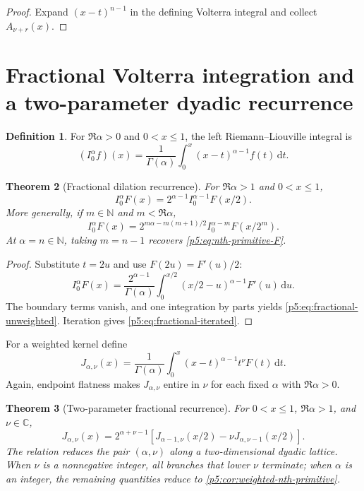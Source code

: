 \documentclass[11pt,oneside]{article}
\newtheorem{theorem}{Theorem}[section]
\theoremstyle{definition}
\newtheorem{definition}[theorem]{Definition}
\theoremstyle{remark}
\newcommand{\C}{\mathbb C}
\newcommand{\N}{\mathbb N}
\newcommand{\dd}{\,\mathrm d}
\newcommand{\1}{\mathbf 1}
\begin{document}
\begin{proof}
Expand $(x-t)^{n-1}$ in the defining Volterra integral and collect $A_{\nu+r}(x)$.
\end{proof}

\section{Fractional Volterra integration and a two-parameter dyadic recurrence}

\begin{definition}
For $\Re\alpha>0$ and $0<x\le1$, the left Riemann--Liouville integral is
\begin{equation}
 (I_0^\alpha f)(x)=\frac1{\Gamma(\alpha)}
 \int_0^x(x-t)^{\alpha-1}f(t)\dd t.
\end{equation}
\end{definition}

\begin{theorem}[Fractional dilation recurrence]\label{p5:thm:fractional-unweighted}
For $\Re\alpha>1$ and $0<x\le1$,
\begin{equation}\label{p5:eq:fractional-unweighted}
 I_0^\alpha F(x)=2^{\alpha-1}I_0^{\alpha-1}F(x/2).
\end{equation}
More generally, if $m\in\N$ and $m<\Re\alpha$,
\begin{equation}\label{p5:eq:fractional-iterated}
 I_0^\alpha F(x)=
 2^{m\alpha-m(m+1)/2}I_0^{\alpha-m}F(x/2^m).
\end{equation}
At $\alpha=n\in\N$, taking $m=n-1$ recovers \eqref{p5:eq:nth-primitive-F}.
\end{theorem}

\begin{proof}
Substitute $t=2u$ and use $F(2u)=F'(u)/2$:
\[
 I_0^\alpha F(x)=\frac{2^{\alpha-1}}{\Gamma(\alpha)}
 \int_0^{x/2}(x/2-u)^{\alpha-1}F'(u)\dd u.
\]
The boundary terms vanish, and one integration by parts yields \eqref{p5:eq:fractional-unweighted}.  Iteration gives \eqref{p5:eq:fractional-iterated}.
\end{proof}

For a weighted kernel define
\begin{equation}\label{p5:eq:J-alpha-nu}
 J_{\alpha,\nu}(x)=
 \frac1{\Gamma(\alpha)}\int_0^x
 (x-t)^{\alpha-1}t^\nu F(t)\dd t.
\end{equation}
Again, endpoint flatness makes $J_{\alpha,\nu}$ entire in $\nu$ for each fixed $\alpha$ with $\Re\alpha>0$.

\begin{theorem}[Two-parameter fractional recurrence]\label{p5:thm:fractional-weighted}
For $0<x\le1$, $\Re\alpha>1$, and $\nu\in\C$,
\begin{equation}\label{p5:eq:fractional-weighted}
\boxed{
 J_{\alpha,\nu}(x)=2^{\alpha+\nu-1}
 \left[J_{\alpha-1,\nu}(x/2)
       -\nu J_{\alpha,\nu-1}(x/2)\right].}
\end{equation}
The relation reduces the pair $(\alpha,\nu)$ along a two-dimensional dyadic lattice.  When $\nu$ is a nonnegative integer, all branches that lower $\nu$ terminate; when $\alpha$ is an integer, the remaining quantities reduce to \cref{p5:cor:weighted-nth-primitive}.
\end{theorem}
\end{document}

